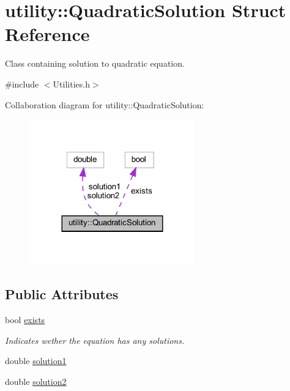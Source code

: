 \hypertarget{structutility_1_1QuadraticSolution}{}\section{utility\+::Quadratic\+Solution Struct Reference}
\label{structutility_1_1QuadraticSolution}


Class containing solution to quadratic equation.  




{\ttfamily \#include $<$Utilities.\+h$>$}



Collaboration diagram for utility\+::Quadratic\+Solution\+:
\nopagebreak
\begin{figure}[H]
\begin{center}
\leavevmode
\includegraphics[width=203pt]{structutility_1_1QuadraticSolution__coll__graph}
\end{center}
\end{figure}
\subsection*{Public Attributes}
\begin{DoxyCompactItemize}
\item 
bool \mbox{\hyperlink{structutility_1_1QuadraticSolution_a76dd00a33b769e90b158877ffc0dc7ee}{exists}}
\begin{DoxyCompactList}\small\item\em Indicates wether the equation has any solutions. \end{DoxyCompactList}\item 
double \mbox{\hyperlink{structutility_1_1QuadraticSolution_ad5483ce614475c079a24d3fda275b98e}{solution1}}
\item 
double \mbox{\hyperlink{structutility_1_1QuadraticSolution_a0841bdbfa4b63ae9e4d0ae95e258f319}{solution2}}
\end{DoxyCompactItemize}


